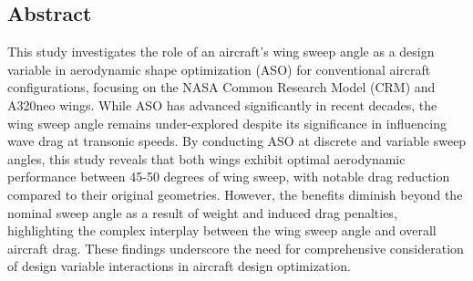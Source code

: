 \thispagestyle{plain}
\begin{center}
  \section*{Abstract}
\end{center}
\begingroup
This study investigates the role of an aircraft's wing sweep angle as a design variable in aerodynamic shape optimization (ASO) for conventional aircraft configurations, focusing on the NASA Common Research Model (CRM) and A320neo wings. While ASO has advanced significantly in recent decades, the wing sweep angle remains under-explored despite its significance in influencing wave drag at transonic speeds. By conducting ASO at discrete and variable sweep angles, this study reveals that both wings exhibit optimal aerodynamic performance between 45-50 degrees of wing sweep, with notable drag reduction compared to their original geometries. However, the benefits diminish beyond the nominal sweep angle as a result of weight and induced drag penalties, highlighting the complex interplay between the wing sweep angle and overall aircraft drag. These findings underscore the need for comprehensive consideration of design variable interactions in aircraft design optimization.
\par
\endgroup
\cleardoublepage